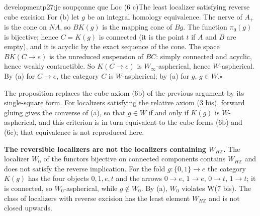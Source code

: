\begin{dcomment}{development}{p27:je soupçonne que Loc (6 c)}{The least localizer satisfying reverse cube excision}
For (b) let $g$ be an integral homology equivalence. The nerve of $A_+$ is the cone on $NA$, so $BK(g)$ is the mapping cone of $Bg$. The function $\pi_0(g)$ is bijective; hence $C=K(g)$ is connected (it is the point $t$ if $A$ and $B$ are empty), and it is acyclic by the exact sequence of the cone. The space $BK(C\to e)$ is the unreduced suspension of $BC$: simply connected and acyclic, hence weakly contractible. So $K(C\to e)$ is $W_\infty$-aspherical, hence $W$-aspherical. By (a) for $C\to e$, the category $C$ is $W$-aspherical; by (a) for $g$, $g\in W$.\hfill$\square$

The proposition replaces the cube axiom (6b) of the previous argument by its single-square form. For localizers satisfying the relative axiom (3 bis), forward gluing gives the converse of (a), so that $g\in W$ if and only if $K(g)$ is $W$-aspherical, and this criterion is in turn equivalent to the cube forms (6b) and (6c); that equivalence is not reproduced here.

\textbf{The reversible localizers are not the localizers containing $W_{H\mathbb Z}$.}\ours
The localizer $W_0$ of the functors bijective on connected components contains $W_{H\mathbb Z}$ and does not satisfy the reverse implication. For the fold $g:\{0,1\}\to e$ the category $K(g)$ has the four objects $0,1,e,t$ and the arrows $0\to e$, $1\to e$, $0\to t$, $1\to t$; it is connected, so $W_0$-aspherical, while $g\notin W_0$. By (a), $W_0$ violates W(7 bis). The class of localizers with reverse excision has the least element $W_{H\mathbb Z}$ and is not closed upwards.
\end{dcomment}

